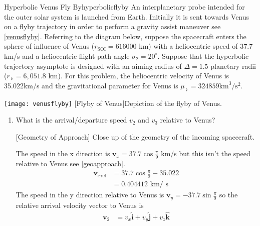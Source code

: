 \begin{examples}{Hyperbolic Venus Fly By}{hyperbolicflyby}
  An interplanetary probe intended for the outer solar system is launched
  from   Earth.
  Initially it is sent towards Venus on a flyby trajectory in order to perform
  a gravity assist maneuver see \cref{venusflyby}.
  Referring to the diagram below, suppose the spacecraft enters the sphere of
  influence of Venus (\(r_{\text{SOI}} = 616000\) km) with a heliocentric
  speed of \(37.7\) km/s and a heliocentric flight path angle
  \(\sigma_2 = 20^{\circ}\).
  Suppose that the hyperbolic trajectory asymptote is designed with an aiming
  radius of \(\Delta = 1.5\) planetary radii (\(r_{\Venus} = 6,051.8\) km).
  For this problem, the heliocentric velocity of Venus is 35.022km/s and the 
  gravitational parameter for Venus is
  \(\mu_{\Venus} = 324859\text{km}^3/\text{s}^2\).
  \par\smallskip
  \begin{minipage}{\linewidth}
    \centering
    \texttt{[image: venusflyby]}
    [Flyby of Venus]{Depiction of the flyby of Venus.}
    \label{venusflyby}
  \end{minipage}
  \begin{enumerate}[label = (\alph*)]
  \item
    What is the arrival/departure speed \(v_2\) and \(v_3\) relative to Venus?
    \par\smallskip
    \begin{minipage}{\linewidth}
      \centering
      
      [Geometry of Approach]
      {Close up of the geometry of the incoming spacecraft.}
      \label{geoapproach}
    \end{minipage}
    \par\smallskip
    The speed in the x direction is \(\mathbf{v}_x = 37.7\cos\frac{\pi}{9}\)
    km/s but this isn't the speed relative to Venus see \cref{geoapproach}.
    \begin{align*} 
      \mathbf{v}_{x\text{rel}} & = 37.7\cos\frac{\pi}{9} - 35.022\\ 
                               & = 0.404412\text{ km}/\text{ s}
    \end{align*}
    The speed in the y direction relative to Venus is
    \(\mathbf{v}_y = -37.7\sin\frac{\pi}{9}\) so the relative arrival velocity
    vector to Venus is
    \begin{align*} 
      \mathbf{v}_2
      & =  v_x\hat{\mathbf{i}} + v_y\hat{\mathbf{j}} + v_z\hat{\mathbf{k}}\\

\end{align*}
\end{enumerate}
\end{examples}
